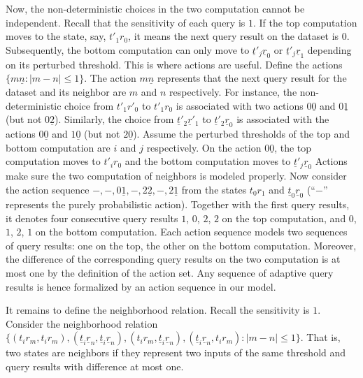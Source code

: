 Now, the non-deterministic choices in the two computation cannot be 
independent. Recall that the sensitivity of each query is
$1$. If the top computation moves to the state, say, $t'_1r_0$, it
means the next query result on the dataset is $0$. Subsequently, the
bottom computation can only move to $\underline{t}'_j\underline{r}_0$
or $\underline{t}'_j\underline{r}_1$ depending on its perturbed
threshold. This is where actions are useful. Define the actions
$\{ m\underline{n} : |m - n| \leq 1 \}$. The action
$m\underline{n}$ represents that the next query result for the dataset
and its neighbor are $m$ and $n$ respectively. For instance, the
non-deterministic choice from $t'_1r'_0$ to $t'_1r_0$ is associated
with two actions $0\underline{0}$ and $0\underline{1}$ (but not
$0\underline{2}$). Similarly, the choice from
$\underline{t}'_2\underline{r}'_1$ to
$\underline{t}'_2\underline{r}_0$ is associated with the actions
$0\underline{0}$ and $1\underline{0}$ (but not $2\underline{0}$). 
Assume the perturbed thresholds of the top and bottom computation are
$i$ and $j$ respectively. On the action $0\underline{0}$, the top
computation moves to $t'_ir_0$ and 
the bottom computation moves to $\underline{t}'_j\underline{r}_0$ 
Actions make sure the two computation of neighbors
is modeled properly. Now consider the action sequence
$-,-,0\underline{1},-,2\underline{2},-,2\underline{1}$ from the states
$t_0r_1$ and $\underline{t}_0\underline{r}_0$ (``$-$'' represents the
purely probabilistic action). Together with the first query results, 
it denotes four consecutive query results $1$, $0$, $2$, $2$ on the
top computation, and $0$, $1$, $2$, $1$ on the bottom computation.
Each action sequence models two sequences of query results: one on the
top, the other on the bottom computation. Moreover, the difference of
the corresponding query results on the two computation is at most one
by the definition of the action set. Any sequence of adaptive query
results is hence formalized by an action sequence in our model.

It remains to define the neighborhood
relation. Recall the sensitivity is $1$. Consider the neighborhood
relation 
$\{ (t_ir_m, t_ir_m),
    (\underline{t}_i\underline{r}_n, \underline{t}_i\underline{r}_n),
    (t_ir_m, \underline{t}_i\underline{r}_n), 
    (\underline{t}_i\underline{r}_n, t_ir_m) : | m - n | \leq 1 \}$.
That is, two states are neighbors if they represent two inputs of the
same threshold and query results with difference at most one.